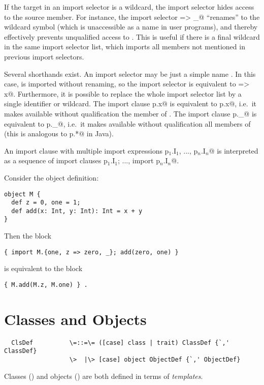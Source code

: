 \documentclass[11pt]{report}
\begin{document}
If the target in an import selector is a wildcard, the import selector
hides access to the source member. For instance, the import selector
\verb@x => _@ ``renames'' \verb@x@ to the wildcard symbol (which is
unaccessible as a name in user programs), and thereby effectively
prevents unqualified access to \verb@x@. This is useful if there is a
final wildcard in the same import selector list, which imports all
members not mentioned in previous import selectors.

Several shorthands exist. An import selector may be just a simple name
\verb@x@. In this case, \verb@x@ is imported without renaming, so the
import selector is equivalent to \verb@x => x@. Furthermore, it is
possible to replace the whole import selector list by a single
identifier or wildcard. The import clause \verb@import p.x@ is
equivalent to \verb@import p.{x}@, i.e.\ it makes available without
qualification the member \verb@x@ of \verb@p@. The import clause
\verb@import p._@ is equivalent to
\verb@import p.{_}@, 
i.e.\ it makes available without qualification all members of \verb@p@
(this is analogous to \verb@import p.*@ in Java).

An import clause with multiple import expressions
\verb@import p$_1$.I$_1$, ..., p$_n$.I$_n$@ is interpreted as a
sequence of import clauses 
\verb@import p$_1$.I$_1$; ..., import p$_n$.I$_n$@.

\example Consider the object definition:
\begin{verbatim}
object M { 
  def z = 0, one = 1; 
  def add(x: Int, y: Int): Int = x + y 
}
\end{verbatim}
Then the block
\begin{verbatim}
{ import M.{one, z => zero, _}; add(zero, one) }
\end{verbatim}
is equivalent to the block 
\begin{verbatim}
{ M.add(M.z, M.one) } .
\end{verbatim}

\chapter{Classes and Objects}
\label{sec:globaldefs}

\syntax\begin{verbatim}
  ClsDef          \=::=\= ([case] class | trait) ClassDef {`,' ClassDef}
                  \>  |\> [case] object ObjectDef {`,' ObjectDef}
\end{verbatim}

Classes () and objects
() are both defined in terms of {\em templates}.
\end{document}

